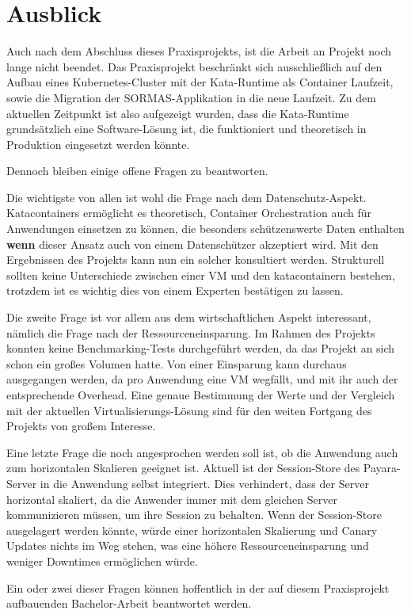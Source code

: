 \chapter{Ausblick}

Auch nach dem Abschluss dieses Praxisprojekts, ist die Arbeit an Projekt noch lange nicht beendet.
Das Praxisprojekt beschränkt sich ausschließlich auf den Aufbau eines Kubernetes-Cluster mit der Kata-Runtime als Container Laufzeit, sowie die Migration der \ac{SORMAS}-Applikation in die neue Laufzeit.
Zu dem aktuellen Zeitpunkt ist also aufgezeigt wurden, dass die Kata-Runtime grundsätzlich eine Software-Lösung ist, die funktioniert und theoretisch in Produktion eingesetzt werden könnte.

Dennoch bleiben einige offene Fragen zu beantworten.

Die wichtigste von allen ist wohl die Frage nach dem Datenschutz-Aspekt.
Katacontainers ermöglicht es theoretisch, Container Orchestration auch für Anwendungen einsetzen zu können, die besonders schützenswerte Daten enthalten \textbf{wenn} dieser Ansatz auch von einem Datenschützer akzeptiert wird.
Mit den Ergebnissen des Projekts kann nun ein solcher konsultiert werden. 
Strukturell sollten keine Unterschiede zwischen einer VM und den katacontainern bestehen, trotzdem ist es wichtig dies von einem Experten bestätigen zu lassen.

Die zweite Frage ist vor allem aus dem wirtschaftlichen Aspekt interessant, nämlich die Frage nach der Ressourceneinsparung.
Im Rahmen des Projekts konnten keine Benchmarking-Tests durchgeführt werden, da das Projekt an sich schon ein großes Volumen hatte.
Von einer Einsparung kann durchaus ausgegangen werden, da pro Anwendung eine \ac{VM} wegfällt, und mit ihr auch der entsprechende Overhead.
Eine genaue Bestimmung der Werte und der Vergleich mit der aktuellen Virtualisierungs-Lösung sind für den weiten Fortgang des Projekts von großem Interesse.

Eine letzte Frage die noch angesprochen werden soll ist, ob die Anwendung auch zum horizontalen Skalieren geeignet ist.
Aktuell ist der Session-Store des Payara-Server in die Anwendung selbst integriert. 
Dies verhindert, dass der Server horizontal skaliert, da die Anwender immer mit dem gleichen Server kommunizieren müssen, um ihre Session zu behalten.
Wenn der Session-Store ausgelagert werden könnte, würde einer horizontalen Skalierung und Canary Updates nichts im Weg stehen, was eine höhere Ressourceneinsparung und weniger Downtimes ermöglichen würde.

Ein oder zwei dieser Fragen können hoffentlich in der auf diesem Praxisprojekt aufbauenden Bachelor-Arbeit beantwortet werden. 